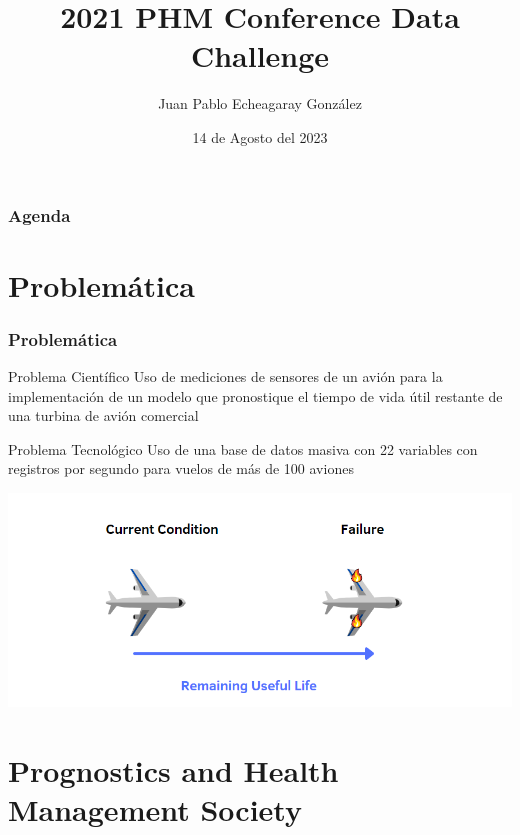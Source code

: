 \documentclass{beamer}
\title{2021 PHM Conference Data Challenge}
\author{Juan Pablo Echeagaray González}
\institute{Tec de Monterrey}
\date{14 de Agosto del 2023}
\begin{document}
    \frame{\titlepage}

    \begin{frame}
        \frametitle{Agenda}
        \tableofcontents
    \end{frame}

    \section{Problemática}
    \begin{frame}
        \frametitle{Problemática}

        \begin{block}{Problema Científico}
            Uso de mediciones de sensores de un avión para la implementación de un modelo que pronostique el tiempo de vida útil restante de una turbina de avión comercial
        \end{block}

        \begin{block}{Problema Tecnológico}
            Uso de una base de datos masiva con 22 variables con registros por segundo para vuelos de más de 100 aviones
        \end{block}

        \centering
        \includegraphics[scale=0.25]{airplane_diagram.png}

    \end{frame}

    \section{Prognostics and Health Management Society}
\end{document}
